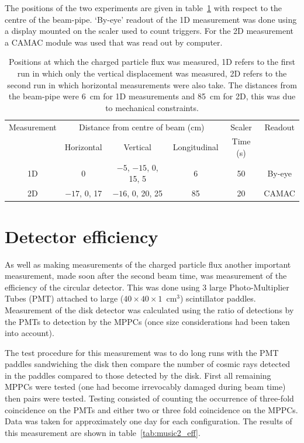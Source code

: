 The positions of the two experiments are given in table~\ref{tab:flux_setup} with respect to the centre of the beam-pipe. `By-eye' readout of the 1D measurement was done using a display mounted on the scaler used to count triggers. For the 2D measurement a CAMAC module was used that was read out by computer.
\begin{table}
  \begin{center}
    \begin{tabular}{c|c|c|c|c|c}
      Measurement  &  \multicolumn{3}{c|}{Distance from centre of beam (cm)}         &  Scaler    &  Readout \\
      &    Horizontal    &       Vertical              &  Longitudinal  &  Time (s)  &          \\
      \hline            
      1D           &  0               &  \(-5\), \(-15\), 0, 15, 5  &       6        &  50        & By-eye   \\
      2D           &  \(-17\), 0, 17  &  \(-16\), 0, 20, 25         &       85       &  20        & CAMAC    \\
    \end{tabular}
  \end{center}
  \caption{Positions at which the charged particle flux was measured, 1D refers to the first run in which only the vertical displacement was measured, 2D refers to the second run in which horizontal measurements were also take. The distances from the beam-pipe were 6~cm for 1D measurements and 85~cm for 2D, this was due to mechanical constraints.}
  \label{tab:flux_setup}
\end{table}

\section{Detector efficiency} %
\label{sec:detector_efficiency}
As well as making measurements of the charged particle flux another important measurement, made soon after the second beam time, was measurement of the efficiency of the circular detector. This was done using 3 large Photo-Multiplier Tubes (PMT) attached to large (\( 40\times40\times1 \)~cm\(^3\)) scintillator paddles. Measurement of the disk detector was calculated using the ratio of detections by the PMTs to detection by the MPPCs (once size considerations had been taken into account).

The test procedure for this measurement was to do long runs with the PMT paddles sandwiching the disk then compare the number of cosmic rays detected in the paddles compared to those detected by the disk. First all remaining MPPCs were tested (one had become irrevocably damaged during beam time) then pairs were tested. Testing consisted of counting the occurrence of three-fold coincidence on the PMTs and either two or three fold coincidence on the MPPCs. Data was taken for approximately one day for each configuration. The results of this measurement are shown in table~\ref{tab:music2_eff}.

